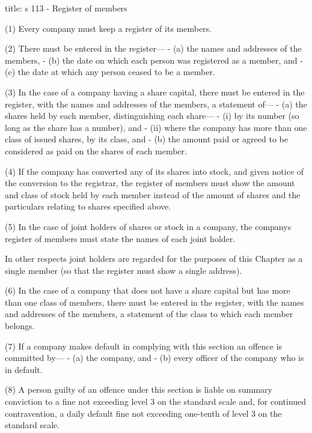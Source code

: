 \documentclass[
]{article}
\newenvironment{Shaded}{}{}
\newcommand{\NormalTok}[1]{#1}
\begin{document}
\begin{Shaded}
\begin{Highlighting}[]
\NormalTok{title: s 113 {-} Register of members}

\NormalTok{(1) Every company must keep a register of its members.}

\NormalTok{(2) There must be entered in the register—}
\NormalTok{{-} (a) the names and addresses of the members,}
\NormalTok{{-} (b) the date on which each person was registered as a member, and}
\NormalTok{{-} (c) the date at which any person ceased to be a member.}

\NormalTok{(3) In the case of a company having a share capital, there must be entered in the register, with the names and addresses of the members, a statement of—}
\NormalTok{{-} (a) the shares held by each member, distinguishing each share—}
\NormalTok{    {-} (i) by its number (so long as the share has a number), and}
\NormalTok{    {-} (ii) where the company has more than one class of issued shares, by its class, and}
\NormalTok{{-} (b) the amount paid or agreed to be considered as paid on the shares of each member.}

\NormalTok{(4) If the company has converted any of its shares into stock, and given notice of the conversion to the registrar, the register of members must show the amount and class of stock held by each member instead of the amount of shares and the particulars relating to shares specified above.}

\NormalTok{(5) In the case of joint holders of shares or stock in a company, the company\textquotesingle{}s register of members must state the names of each joint holder.}

\NormalTok{In other respects joint holders are regarded for the purposes of this Chapter as a single member (so that the register must show a single address).}

\NormalTok{(6) In the case of a company that does not have a share capital but has more than one class of members, there must be entered in the register, with the names and addresses of the members, a statement of the class to which each member belongs.}

\NormalTok{(7) If a company makes default in complying with this section an offence is committed by—}
\NormalTok{{-} (a) the company, and}
\NormalTok{{-} (b) every officer of the company who is in default.}

\NormalTok{(8) A person guilty of an offence under this section is liable on summary conviction to a fine not exceeding level 3 on the standard scale and, for continued contravention, a daily default fine not exceeding one{-}tenth of level 3 on the standard scale.}
\end{Highlighting}
\end{Shaded}
\end{document}
